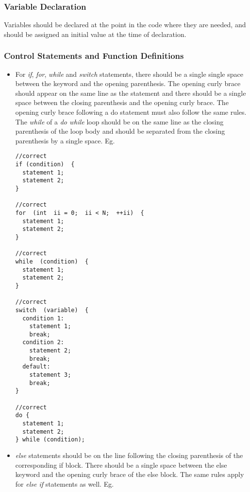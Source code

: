 \subsubsection{Variable Declaration}

Variables should be declared at the point in the code where they are
needed, and should be assigned an initial value at the time of
declaration.


\subsubsection{Control Statements and Function Definitions}

\begin{itemize}

  \item For \textit{if}, \textit{for}, \textit{while}
and \textit{switch} statements, there should be a single single space
between the keyword and the opening parenthesis.  The opening curly
brace should appear on the same line as the statement and there should
be a single space between the closing parenthesis and the opening
curly brace.  The opening curly brace following a do statement must
also follow the same rules.  The \textit{while} of a \textit{do while}
loop should be on the same line as the closing parenthesis of the loop
body and should be separated from the closing parenthesis by a single
space.  Eg.

\smallskip
\begin{lstlisting}
//correct
if (condition)  { 
  statement 1; 
  statement 2;
}

//correct
for  (int  ii = 0;  ii < N;  ++ii)  {
  statement 1;
  statement 2;
}

//correct
while  (condition)  { 
  statement 1; 
  statement 2;
}

//correct
switch  (variable)  {
  condition 1: 
    statement 1; 
    break;
  condition 2: 
    statement 2; 
    break;
  default: 
    statement 3; 
    break;
}

//correct 
do {
  statement 1;
  statement 2;
} while (condition);
\end{lstlisting}
\smallskip



  \item \textit{else} statements should be on the line following the
closing parenthesis of the corresponding if block. There should be a
single space between the else keyword and the opening curly brace of
the else block. The same rules apply for \textit{else if} statements
as well.  Eg.


\end{itemize}
